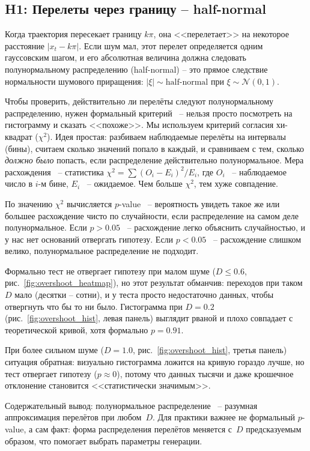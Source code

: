 \documentclass[12pt,a4paper]{article}
\begin{document}
\subsection{H1: Перелеты через границу  -- half-normal}

Когда траектория пересекает границу $k\pi$, она <<перелетает>> на некоторое расстояние $|x_t - k\pi|$. Если шум мал, этот перелет определяется одним гауссовским шагом, и его абсолютная величина должна следовать полунормальному распределению (half-normal)  -- это прямое следствие нормальности шумового приращения: $|\xi| \sim \text{half-normal}$ при $\xi \sim \mathcal{N}(0,1)$.

Чтобы проверить, действительно ли перелёты следуют полунормальному распределению, нужен формальный критерий~ -- нельзя просто посмотреть на гистограмму и сказать <<похоже>>. Мы используем критерий согласия хи-квадрат ($\chi^2$). Идея простая: разбиваем наблюдаемые перелёты на интервалы (бины), считаем сколько значений попало в каждый, и сравниваем с тем, сколько \textit{должно было} попасть, если распределение действительно полунормальное. Мера расхождения~ -- статистика $\chi^2 = \sum (O_i - E_i)^2 / E_i$, где $O_i$~ -- наблюдаемое число в $i$-м бине, $E_i$~ -- ожидаемое. Чем больше $\chi^2$, тем хуже совпадение.

По значению $\chi^2$ вычисляется $p$-value~ -- вероятность увидеть такое же или большее расхождение чисто по случайности, если распределение на самом деле полунормальное. Если $p > 0.05$~ -- расхождение легко объяснить случайностью, и у нас нет оснований отвергать гипотезу. Если $p < 0.05$~ -- расхождение слишком велико, полунормальное распределение не подходит.

Формально тест не отвергает гипотезу при малом шуме ($D \leq 0.6$, рис.~\ref{fig:overshoot_heatmap}), но этот результат обманчив: переходов при таком~$D$ мало (десятки -- сотни), и у теста просто недостаточно данных, чтобы отвергнуть что бы то ни было. Гистограмма при $D = 0.2$ (рис.~\ref{fig:overshoot_hist}, левая панель) выглядит рваной и плохо совпадает с теоретической кривой, хотя формально $p = 0.91$.

При более сильном шуме ($D = 1.0$, рис.~\ref{fig:overshoot_hist}, третья панель) ситуация обратная: визуально гистограмма ложится на кривую гораздо лучше, но тест отвергает гипотезу ($p \approx 0$), потому что данных тысячи и даже крошечное отклонение становится <<статистически значимым>>.

Содержательный вывод: полунормальное распределение~ -- разумная аппроксимация перелётов при любом~$D$. Для практики важнее не формальный $p$-value, а сам факт: форма распределения перелётов меняется с~$D$ предсказуемым образом, что помогает выбрать параметры генерации.
\end{document}
